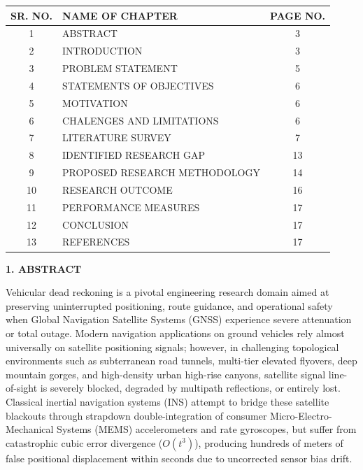 \documentclass[11pt,a4paper]{article}
\begin{document}
\begin{center}
\renewcommand{\arraystretch}{1.55}
\begin{tabular}{|c|p{10.5cm}|c|}
\hline
\textbf{SR. NO.} & \textbf{NAME OF CHAPTER} & \textbf{PAGE NO.} \\
\hline
1 & ABSTRACT & 3 \\
\hline
2 & INTRODUCTION & 3 \\
\hline
3 & PROBLEM STATEMENT & 5 \\
\hline
4 & STATEMENTS OF OBJECTIVES & 6 \\
\hline
5 & MOTIVATION & 6 \\
\hline
6 & CHALENGES AND LIMITATIONS & 6 \\
\hline
7 & LITERATURE SURVEY & 7 \\
\hline
8 & IDENTIFIED RESEARCH GAP & 13 \\
\hline
9 & PROPOSED RESEARCH METHODOLOGY & 14 \\
\hline
10 & RESEARCH OUTCOME & 16 \\
\hline
11 & PERFORMANCE MEASURES & 17 \\
\hline
12 & CONCLUSION & 17 \\
\hline
13 & REFERENCES & 17 \\
\hline
\end{tabular}
\end{center}
\vfill
\newpage

\begin{center}
{\large \textbf{1. ABSTRACT}}
\end{center}

Vehicular dead reckoning is a pivotal engineering research domain aimed at preserving uninterrupted positioning, route guidance, and operational safety when Global Navigation Satellite Systems (GNSS) experience severe attenuation or total outage. Modern navigation applications on ground vehicles rely almost universally on satellite positioning signals; however, in challenging topological environments such as subterranean road tunnels, multi-tier elevated flyovers, deep mountain gorges, and high-density urban high-rise canyons, satellite signal line-of-sight is severely blocked, degraded by multipath reflections, or entirely lost. Classical inertial navigation systems (INS) attempt to bridge these satellite blackouts through strapdown double-integration of consumer Micro-Electro-Mechanical Systems (MEMS) accelerometers and rate gyroscopes, but suffer from catastrophic cubic error divergence ($O(t^3)$), producing hundreds of meters of false positional displacement within seconds due to uncorrected sensor bias drift.
\end{document}

